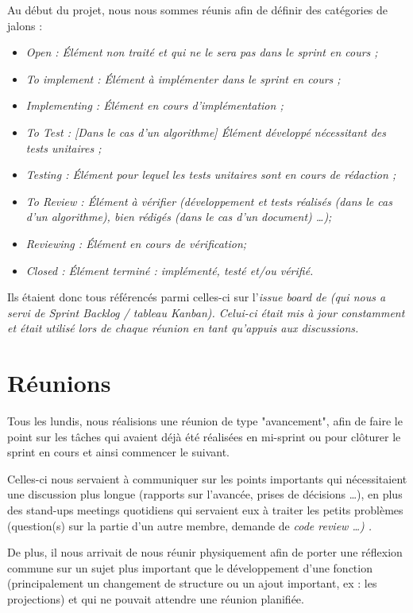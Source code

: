 \documentclass[a4paper, 12pt]{report}
\newcommand{\tech}[1]{\sf{#1}}
\newcommand{\gl}{\tech{GitLab}}
\newcommand{\en}[1]{\it{#1}}
\begin{document}
    Au début du projet, nous nous sommes réunis afin de définir des catégories de jalons :
    \begin{itemize}
        \item \en{Open} : Élément non traité et qui ne le sera pas dans le sprint en cours ;
        \item \en{To implement} : Élément à implémenter dans le sprint en cours ;
        \item \en{Implementing} : Élément en cours d'implémentation ;
        \item \en{To Test} : [Dans le cas d'un algorithme] Élément développé nécessitant des tests unitaires ;
        \item \en{Testing} : Élément pour lequel les tests unitaires sont en cours de rédaction ;
        \item \en{To Review} : Élément à vérifier (développement et tests réalisés (dans le cas d'un algorithme), bien rédigés (dans le cas d'un document) \ldots{});
        \item \en{Reviewing} : Élément en cours de vérification;
        \item \en{Closed} : Élément terminé : implémenté, testé et/ou vérifié.
    \end{itemize}
    
    Ils étaient donc tous référencés parmi celles-ci sur l'\en{issue board} de \gl{} (qui nous a servi de \en{Sprint Backlog} / tableau Kanban).
    Celui-ci était mis à jour constamment et était utilisé lors de chaque réunion en tant qu'appuis aux discussions.
    
    \section{Réunions}
    
    Tous les lundis, nous réalisions une réunion de type "avancement", afin de faire le point sur les tâches qui avaient déjà été réalisées en mi-sprint ou pour clôturer le sprint en cours et ainsi commencer le suivant.
    
    Celles-ci nous servaient à communiquer sur les points importants qui nécessitaient une discussion plus longue (rapports sur l'avancée, prises de décisions \ldots{}), en plus des stand-ups meetings quotidiens qui servaient eux à traiter les petits problèmes (question(s) sur la partie d'un autre membre, demande de \en{code review} \ldots{}) .
    
    De plus, il nous arrivait de nous réunir physiquement afin de porter une réflexion commune sur un sujet plus important que le développement d'une fonction (principalement un changement de structure ou un ajout important, ex : les projections) et qui ne pouvait attendre une réunion planifiée.
    
\end{document}

